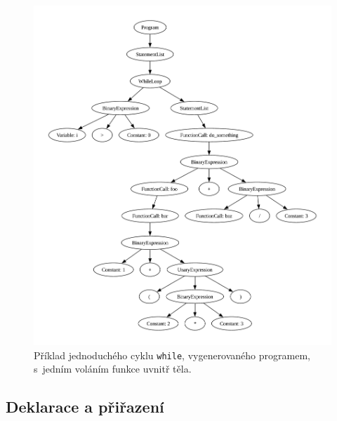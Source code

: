 \begin{figure}[h!]
	\centering
	\includegraphics[width=\textwidth]{obrazky-figures/ast_while_loop.pdf}
	\caption{Příklad jednoduchého cyklu \texttt{while}, vygenerovaného programem, s~jedním voláním funkce uvnitř těla.}
	\label{fig_ast_while_loop}
\end{figure}

\newpage

\subsection*{Deklarace a přiřazení}

